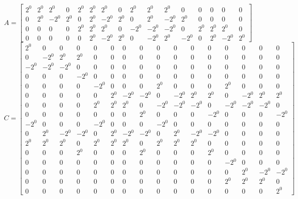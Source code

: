 \documentclass{article}%
\begin{document}
\[%
A = \left[\begin{array}{cccccccccccccccc}2^{0} & 2^{0} & 2^{0} & 0 & 2^{0} & 2^{0} & 2^{0} & 0 & 2^{0} & 2^{0} & 2^{0} & 0 & 0 & 0 & 0 & 0\\0 & 2^{0} & - 2^{0} & 2^{0} & 0 & 2^{0} & - 2^{0} & 2^{0} & 0 & 2^{0} & - 2^{0} & 2^{0} & 0 & 0 & 0 & 0\\0 & 0 & 0 & 0 & 2^{0} & 2^{0} & 2^{0} & 0 & - 2^{0} & - 2^{0} & - 2^{0} & 0 & 2^{0} & 2^{0} & 2^{0} & 0\\0 & 0 & 0 & 0 & 0 & 2^{0} & - 2^{0} & 2^{0} & 0 & - 2^{0} & 2^{0} & - 2^{0} & 0 & 2^{0} & - 2^{0} & 2^{0}\end{array}\right]%
\]%
\[%
C = \left[\begin{array}{cccccccccccccccc}2^{0} & 0 & 0 & 0 & 0 & 0 & 0 & 0 & 0 & 0 & 0 & 0 & 0 & 0 & 0 & 0\\0 & - 2^{0} & 2^{0} & 2^{0} & 0 & 0 & 0 & 0 & 0 & 0 & 0 & 0 & 0 & 0 & 0 & 0\\- 2^{0} & - 2^{0} & - 2^{0} & 0 & 0 & 0 & 0 & 0 & 0 & 0 & 0 & 0 & 0 & 0 & 0 & 0\\0 & 0 & 0 & - 2^{0} & 0 & 0 & 0 & 0 & 0 & 0 & 0 & 0 & 0 & 0 & 0 & 0\\0 & 0 & 0 & 0 & - 2^{0} & 0 & 0 & 0 & 2^{0} & 0 & 0 & 0 & 2^{0} & 0 & 0 & 0\\0 & 0 & 0 & 0 & 0 & 2^{0} & - 2^{0} & - 2^{0} & 0 & - 2^{0} & 2^{0} & 2^{0} & 0 & - 2^{0} & 2^{0} & 2^{0}\\0 & 0 & 0 & 0 & 2^{0} & 2^{0} & 2^{0} & 0 & - 2^{0} & - 2^{0} & - 2^{0} & 0 & - 2^{0} & - 2^{0} & - 2^{0} & 0\\0 & 0 & 0 & 0 & 0 & 0 & 0 & 2^{0} & 0 & 0 & 0 & - 2^{0} & 0 & 0 & 0 & - 2^{0}\\- 2^{0} & 0 & 0 & 0 & - 2^{0} & 0 & 0 & 0 & - 2^{0} & 0 & 0 & 0 & 0 & 0 & 0 & 0\\0 & 2^{0} & - 2^{0} & - 2^{0} & 0 & 2^{0} & - 2^{0} & - 2^{0} & 0 & 2^{0} & - 2^{0} & - 2^{0} & 0 & 0 & 0 & 0\\2^{0} & 2^{0} & 2^{0} & 0 & 2^{0} & 2^{0} & 2^{0} & 0 & 2^{0} & 2^{0} & 2^{0} & 0 & 0 & 0 & 0 & 0\\0 & 0 & 0 & 2^{0} & 0 & 0 & 0 & 2^{0} & 0 & 0 & 0 & 2^{0} & 0 & 0 & 0 & 0\\0 & 0 & 0 & 0 & 0 & 0 & 0 & 0 & 0 & 0 & 0 & 0 & - 2^{0} & 0 & 0 & 0\\0 & 0 & 0 & 0 & 0 & 0 & 0 & 0 & 0 & 0 & 0 & 0 & 0 & 2^{0} & - 2^{0} & - 2^{0}\\0 & 0 & 0 & 0 & 0 & 0 & 0 & 0 & 0 & 0 & 0 & 0 & 2^{0} & 2^{0} & 2^{0} & 0\\0 & 0 & 0 & 0 & 0 & 0 & 0 & 0 & 0 & 0 & 0 & 0 & 0 & 0 & 0 & 2^{0}\end{array}\right]%
\]%
\end{document}
